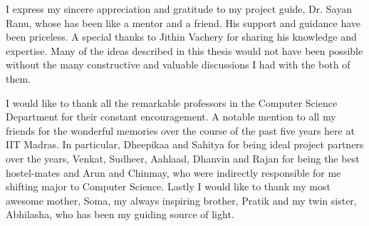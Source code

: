 I express my sincere appreciation and gratitude to my project guide, Dr. Sayan Ranu, whose has been like a mentor and a friend. His support and guidance have been priceless. A special thanks to Jithin Vachery for sharing his knowledge and expertise. Many of the ideas described in this thesis would not have been possible without the many constructive and valuable discussions I had with the both of them.

I would like to thank all the remarkable professors in the Computer Science Department for their constant encouragement. A notable mention to all my friends for the wonderful memories over the course of the past five years here at IIT Madras. In particular, Dheepikaa and Sahitya for being ideal project partners over the years, Venkat, Sudheer, Aahlaad, Dhanvin and Rajan for being the best hostel-mates and Arun and Chinmay, who were indirectly responsible for me shifting major to Computer Science. Lastly I would like to thank my most awesome mother, Soma, my always inspiring brother, Pratik and my twin sister, Abhilasha, who has been my guiding source of light.
      